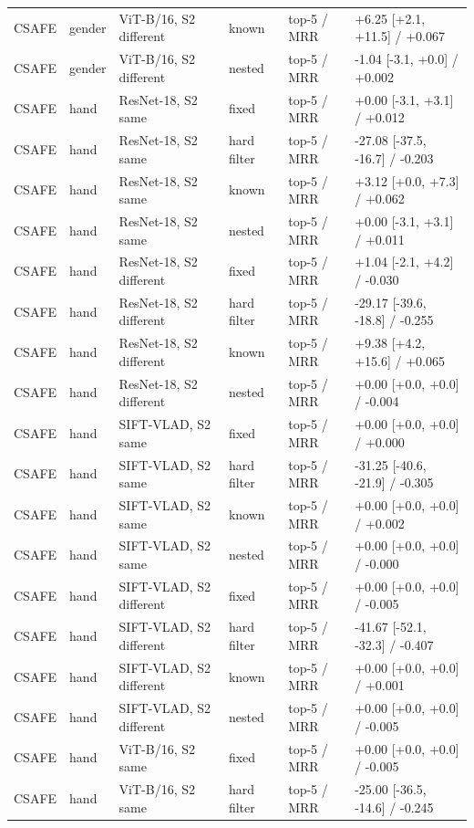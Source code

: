 \documentclass[10pt,a4paper]{article}
\begin{document}
{\begin{longtable}{llllll}
CSAFE & gender & ViT-B/16, S2 different & known & top-5 / MRR & +6.25 [+2.1, +11.5] / +0.067 \\
CSAFE & gender & ViT-B/16, S2 different & nested & top-5 / MRR & -1.04 [-3.1, +0.0] / +0.002 \\
CSAFE & hand & ResNet-18, S2 same & fixed & top-5 / MRR & +0.00 [-3.1, +3.1] / +0.012 \\
CSAFE & hand & ResNet-18, S2 same & hard filter & top-5 / MRR & -27.08 [-37.5, -16.7] / -0.203 \\
CSAFE & hand & ResNet-18, S2 same & known & top-5 / MRR & +3.12 [+0.0, +7.3] / +0.062 \\
CSAFE & hand & ResNet-18, S2 same & nested & top-5 / MRR & +0.00 [-3.1, +3.1] / +0.011 \\
CSAFE & hand & ResNet-18, S2 different & fixed & top-5 / MRR & +1.04 [-2.1, +4.2] / -0.030 \\
CSAFE & hand & ResNet-18, S2 different & hard filter & top-5 / MRR & -29.17 [-39.6, -18.8] / -0.255 \\
CSAFE & hand & ResNet-18, S2 different & known & top-5 / MRR & +9.38 [+4.2, +15.6] / +0.065 \\
CSAFE & hand & ResNet-18, S2 different & nested & top-5 / MRR & +0.00 [+0.0, +0.0] / -0.004 \\
CSAFE & hand & SIFT-VLAD, S2 same & fixed & top-5 / MRR & +0.00 [+0.0, +0.0] / +0.000 \\
CSAFE & hand & SIFT-VLAD, S2 same & hard filter & top-5 / MRR & -31.25 [-40.6, -21.9] / -0.305 \\
CSAFE & hand & SIFT-VLAD, S2 same & known & top-5 / MRR & +0.00 [+0.0, +0.0] / +0.002 \\
CSAFE & hand & SIFT-VLAD, S2 same & nested & top-5 / MRR & +0.00 [+0.0, +0.0] / -0.000 \\
CSAFE & hand & SIFT-VLAD, S2 different & fixed & top-5 / MRR & +0.00 [+0.0, +0.0] / -0.005 \\
CSAFE & hand & SIFT-VLAD, S2 different & hard filter & top-5 / MRR & -41.67 [-52.1, -32.3] / -0.407 \\
CSAFE & hand & SIFT-VLAD, S2 different & known & top-5 / MRR & +0.00 [+0.0, +0.0] / +0.001 \\
CSAFE & hand & SIFT-VLAD, S2 different & nested & top-5 / MRR & +0.00 [+0.0, +0.0] / -0.005 \\
CSAFE & hand & ViT-B/16, S2 same & fixed & top-5 / MRR & +0.00 [+0.0, +0.0] / -0.005 \\
CSAFE & hand & ViT-B/16, S2 same & hard filter & top-5 / MRR & -25.00 [-36.5, -14.6] / -0.245 \\

\end{longtable}}
\end{document}
